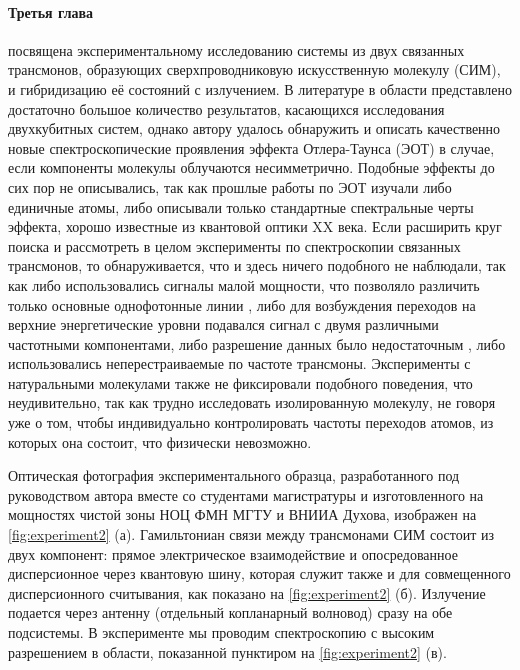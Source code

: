 \documentclass[14pt, a4paper]{extarticle}
\begin{document}
\paragraph{Третья глава} посвящена экспериментальному исследованию системы из двух связанных трансмонов, образующих сверхпроводниковую искусственную молекулу (СИМ), и гибридизацию её состояний с излучением. В литературе в области представлено достаточно большое количество результатов, касающихся исследования двухкубитных систем, однако автору удалось обнаружить и описать качественно новые спектроскопические проявления эффекта Отлера-Таунса (ЭОТ) в случае, если компоненты молекулы облучаются несимметрично. Подобные эффекты до сих пор не описывались, так как прошлые работы по ЭОТ изучали либо единичные атомы, либо описывали только стандартные спектральные черты эффекта, хорошо известные из квантовой оптики XX века. Если расширить круг поиска и рассмотреть в целом эксперименты по спектроскопии связанных трансмонов, то обнаруживается, что и здесь ничего подобного не наблюдали, так как либо использовались сигналы малой мощности, что позволяло различить только основные однофотонные линии , либо для возбуждения переходов на верхние энергетические уровни подавался сигнал с двумя различными частотными компонентами, либо разрешение данных было недостаточным , либо использовались неперестраиваемые по частоте трансмоны. Эксперименты с натуральными молекулами также не фиксировали подобного поведения, что неудивительно, так как трудно исследовать изолированную молекулу, не говоря уже о том, чтобы индивидуально контролировать частоты переходов атомов, из которых она состоит, что физически невозможно.

Оптическая фотография экспериментального образца, разработанного под руководством автора вместе со студентами магистратуры и изготовленного на мощностях чистой зоны НОЦ ФМН МГТУ и ВНИИА Духова, изображен на \autoref{fig:experiment2} (а). Гамильтониан связи между трансмонами СИМ состоит из двух компонент: прямое электрическое взаимодействие и опосредованное дисперсионное через квантовую шину, которая служит также и для совмещенного дисперсионного считывания, как показано на \autoref{fig:experiment2} (б). Излучение подается через антенну (отдельный копланарный волновод) сразу на обе подсистемы. В эксперименте мы проводим спектроскопию с высоким разрешением в области, показанной пунктиром на \autoref{fig:experiment2} (в).
\end{document}
